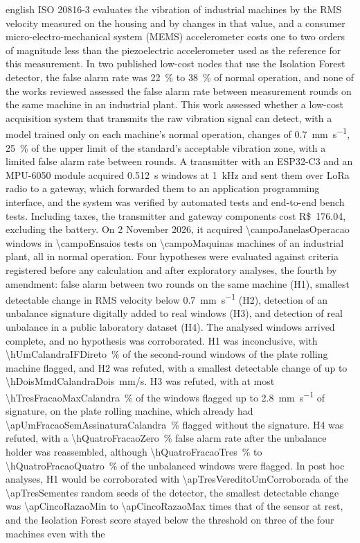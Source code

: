 \begin{resumo}[Abstract]
\begin{otherlanguage*}{english}
ISO 20816-3 evaluates the vibration of industrial machines by the RMS velocity measured on the housing and by changes in that value, and a consumer micro-electro-mechanical system (MEMS) accelerometer costs one to two orders of magnitude less than the piezoelectric accelerometer used as the reference for this measurement. In two published low-cost nodes that use the Isolation Forest detector, the false alarm rate was \SI{22}{\percent} to \SI{38}{\percent} of normal operation, and none of the works reviewed assessed the false alarm rate between measurement rounds on the same machine in an industrial plant. This work assessed whether a low-cost acquisition system that transmits the raw vibration signal can detect, with a model trained only on each machine's normal operation, changes of \SI{0,7}{\milli\meter\per\second}, \SI{25}{\percent} of the upper limit of the standard's acceptable vibration zone, with a limited false alarm rate between rounds. A transmitter with an ESP32-C3 and an MPU-6050 module acquired \SI{0,512}{\second} windows at \SI{1}{\kilo\hertz} and sent them over LoRa radio to a gateway, which forwarded them to an application programming interface, and the system was verified by automated tests and end-to-end bench tests. Including taxes, the transmitter and gateway components cost R\$~\num{176,04}, excluding the battery. On 2 November 2026, it acquired \num{\campoJanelasOperacao} windows in \num{\campoEnsaios} tests on \num{\campoMaquinas} machines of an industrial plant, all in normal operation. Four hypotheses were evaluated against criteria registered before any calculation and after exploratory analyses, the fourth by amendment: false alarm between two rounds on the same machine (H1), smallest detectable change in RMS velocity below \SI{0,7}{\milli\meter\per\second} (H2), detection of an unbalance signature digitally added to real windows (H3), and detection of real unbalance in a public laboratory dataset (H4). The analysed windows arrived complete, and no hypothesis was corroborated. H1 was inconclusive, with \num{\hUmCalandraIFDireto}~\% of the second-round windows of the plate rolling machine flagged, and H2 was refuted, with a smallest detectable change of up to \num{\hDoisMmdCalandraDois}~mm/s. H3 was refuted, with at most \num{\hTresFracaoMaxCalandra}~\% of the windows flagged up to \SI{2,8}{\milli\meter\per\second} of signature, on the plate rolling machine, which already had \num{\apUmFracaoSemAssinaturaCalandra}~\% flagged without the signature. H4 was refuted, with a \num{\hQuatroFracaoZero}~\% false alarm rate after the unbalance holder was reassembled, although \num{\hQuatroFracaoTres}~\% to \num{\hQuatroFracaoQuatro}~\% of the unbalanced windows were flagged. In post hoc analyses, H1 would be corroborated with \num{\apTresVereditoUmCorroborada} of the \num{\apTresSementes} random seeds of the detector, the smallest detectable change was \num{\apCincoRazaoMin} to \num{\apCincoRazaoMax} times that of the sensor at rest, and the Isolation Forest score stayed below the threshold on three of the four machines even with the 
\end{otherlanguage*}
\end{resumo}

